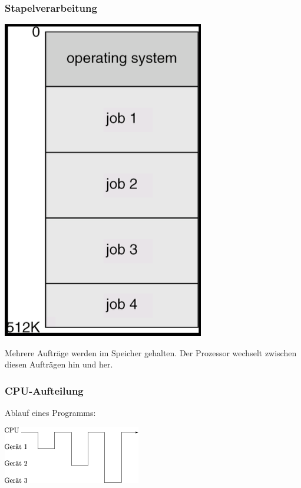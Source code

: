 \documentclass[11pt]{article}
\begin{document}
\subsubsection*{Stapelverarbeitung}
\label{sec:org5f46e13}
\begin{center}
\includegraphics[width=.9\linewidth]{./Abbildungen/mehrprogrammbetrieb.png}
\end{center} Mehrere Aufträge werden im
Speicher gehalten. Der Prozessor wechselt zwischen diesen Aufträgen
hin und her.
\subsubsection*{CPU-Aufteilung}
\label{sec:org052f4de}

\begin{nebeneinander}
Ablauf eines Programms:
\begin{center}
\includegraphics[width=.9\linewidth]{./Abbildungen/EinProgrammbetrieb.png}
\end{center}
\end{nebeneinander}
\end{document}
